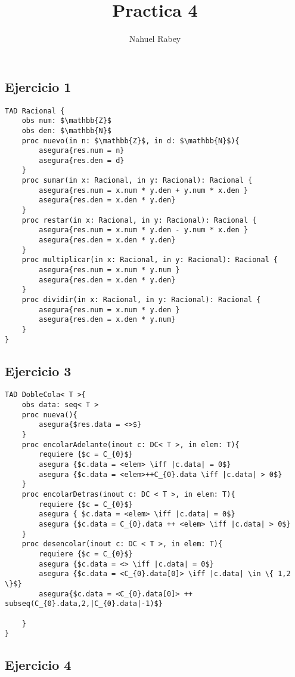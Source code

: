 \documentclass[6pt]{article}
\title{Practica 4}
\author{Nahuel Rabey}
\begin{document}
\maketitle

\subsection*{Ejercicio 1}
\begin{lstlisting}
TAD Racional {
	obs num: $\mathbb{Z}$
	obs den: $\mathbb{N}$
	proc nuevo(in n: $\mathbb{Z}$, in d: $\mathbb{N}$){
		asegura{res.num = n}
		asegura{res.den = d}
	}
	proc sumar(in x: Racional, in y: Racional): Racional {
		asegura{res.num = x.num * y.den + y.num * x.den }
		asegura{res.den = x.den * y.den}
	}
	proc restar(in x: Racional, in y: Racional): Racional {
		asegura{res.num = x.num * y.den - y.num * x.den }
		asegura{res.den = x.den * y.den}
	}
	proc multiplicar(in x: Racional, in y: Racional): Racional {
		asegura{res.num = x.num * y.num }
		asegura{res.den = x.den * y.den}
	}
	proc dividir(in x: Racional, in y: Racional): Racional {
		asegura{res.num = x.num * y.den }
		asegura{res.den = x.den * y.num}
	}
}
\end{lstlisting}

\subsection*{Ejercicio 3}
\begin{lstlisting}
TAD DobleCola< T >{
	obs data: seq< T >
	proc nueva(){
		asegura{$res.data = <>$}
	}
	proc encolarAdelante(inout c: DC< T >, in elem: T){
		requiere {$c = C_{0}$}
		asegura {$c.data = <elem> \iff |c.data| = 0$}
		asegura {$c.data = <elem>++C_{0}.data \iff |c.data| > 0$}
	}
	proc encolarDetras(inout c: DC < T >, in elem: T){
		requiere {$c = C_{0}$}
		asegura { $c.data = <elem> \iff |c.data| = 0$}
		asegura {$c.data = C_{0}.data ++ <elem> \iff |c.data| > 0$}
	}
	proc desencolar(inout c: DC < T >, in elem: T){
		requiere {$c = C_{0}$}
		asegura {$c.data = <> \iff |c.data| = 0$}
		asegura {$c.data = <C_{0}.data[0]> \iff |c.data| \in \{ 1,2 \}$}
		asegura{$c.data = <C_{0}.data[0]> ++ subseq(C_{0}.data,2,|C_{0}.data|-1)$}
		
	}
}
\end{lstlisting}

\subsection*{Ejercicio 4}
\end{document}
